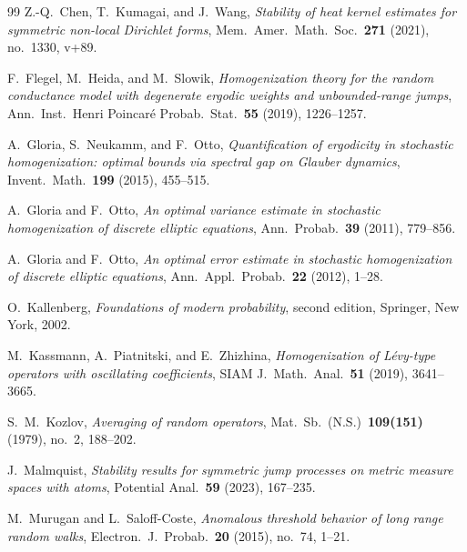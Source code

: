 \documentclass[11pt]{amsart}
\numberwithin{equation}{section}
\begin{document}
\begin{thebibliography}{99}
Z.-Q.~Chen, T.~Kumagai, and J.~Wang,
\emph{Stability of heat kernel estimates for symmetric non-local Dirichlet forms},
Mem.\ Amer.\ Math.\ Soc.\ \textbf{271} (2021), no.~1330, v+89.

F.~Flegel, M.~Heida, and M.~Slowik,
\emph{Homogenization theory for the random conductance model with degenerate ergodic weights and unbounded-range jumps},
Ann.\ Inst.\ Henri Poincar\'e Probab.\ Stat.\ \textbf{55} (2019), 1226--1257.

A.~Gloria, S.~Neukamm, and F.~Otto,
\emph{Quantification of ergodicity in stochastic homogenization: optimal bounds via spectral gap on Glauber dynamics},
Invent.\ Math.\ \textbf{199} (2015), 455--515.

A.~Gloria and F.~Otto,
\emph{An optimal variance estimate in stochastic homogenization of discrete elliptic equations},
Ann.\ Probab.\ \textbf{39} (2011), 779--856.

A.~Gloria and F.~Otto,
\emph{An optimal error estimate in stochastic homogenization of discrete elliptic equations},
Ann.\ Appl.\ Probab.\ \textbf{22} (2012), 1--28.

O.~Kallenberg,
\emph{Foundations of modern probability}, second edition,
Springer, New York, 2002.

M.~Kassmann, A.~Piatnitski, and E.~Zhizhina,
\emph{Homogenization of L\'evy-type operators with oscillating coefficients},
SIAM J.\ Math.\ Anal.\ \textbf{51} (2019), 3641--3665.

S.~M.~Kozlov,
\emph{Averaging of random operators},
Mat.\ Sb.\ (N.S.)\ \textbf{109(151)} (1979), no.~2, 188--202.

J.~Malmquist,
\emph{Stability results for symmetric jump processes on metric measure spaces with atoms},
Potential Anal.\ \textbf{59} (2023), 167--235.

M.~Murugan and L.~Saloff-Coste,
\emph{Anomalous threshold behavior of long range random walks},
Electron.\ J.\ Probab.\ \textbf{20} (2015), no.~74, 1--21.


\end{thebibliography}
\end{document}
